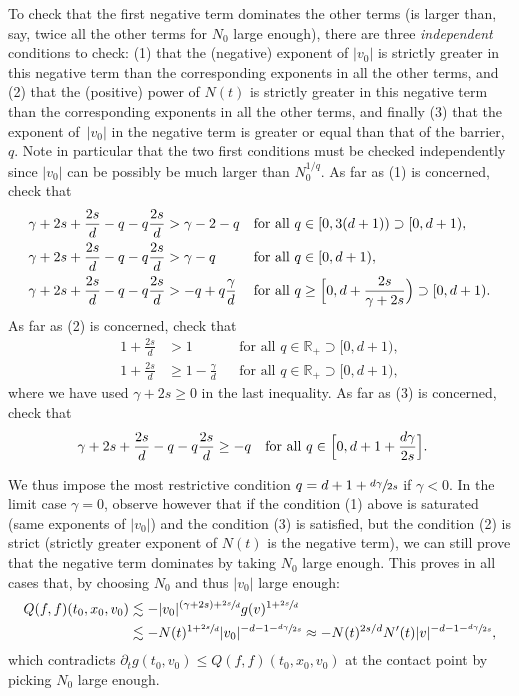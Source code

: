 \documentclass[JEP,XML,SOM,Unicode,NoFloatCountersInSection]{cedram}
\theoremstyle{plain}
\theoremstyle{definition}
\numberwithin{equation}{section}
\newcommand{\R}{\mathbb R}
\let\A N
\newcommand{\Ao}{N_0}
\begin{document}
To check that the first negative term dominates the other terms
(\ie is larger than, say, twice all the other terms for $\Ao$ large
enough), there are three \emph{independent} conditions to check: (1)
that the (negative) exponent of $|v_0|$ is strictly greater in this
negative term than the corresponding exponents in all the other terms,
and (2) that the (positive) power of $\A(t)$ is strictly greater in
this negative term than the corresponding exponents in all the other
terms, and finally (3) that the exponent of~$|v_0|$ in the negative
term is greater or equal than that of the barrier, \ie $q$. Note in
particular that the two first conditions must be checked independently since
$|v_0|$ can be possibly be much larger than $\Ao^{1/q}$. As far as (1)
is concerned, check that
\begin{align*}
\gamma + 2s + \frac{2s}{d} -q -q\frac{2s}{d}
& > \gamma - 2 - q
&& \text{for all $q \in [0,3(d+1)) \supset [0,d+1)$}, \\
\gamma + 2s + \frac{2s}{d} -q -q\frac{2s}{d}
& > \gamma - q
&& \text{for all $q \in [0,d+1)$}, \\
\gamma + 2s + \frac{2s}{d} -q -q\frac{2s}{d}
& > - q + q \frac{\gamma}{d}
&& \text{for all $q \ge \Bigl[0,d+\frac{2s}{\gamma+2s}\Bigr)
\supset [0,d+1)$}.
\end{align*}
As far as (2) is concerned, check that
\begin{align*}
1+\frac{2s}{d}
& > 1
&& \text{for all $q \in \R_+ \supset [0,d+1)$}, \\
1 + \frac{2s}{d}
& \ge 1- \frac{\gamma}{d}
&& \text{for all $q \in \R_+ \supset [0,d+1)$},
\end{align*}
where we have used $\gamma + 2s \ge 0$ in the last inequality. As far
as (3) is concerned, check that
\begin{align*}
\gamma + 2s + \frac{2s}{d} - q - q \frac{2s}{d}
& \ge -q
&& \text{for all $q \in \Bigl[0,d+1 + \frac{d\gamma}{2s}\Bigr]$.}
\end{align*}

We thus impose the most restrictive condition
$q = d+1 + \sfrac{d\gamma}{2s}$ if $\gamma <0$. In the limit case
$\gamma=0$, observe however that if the condition (1) above is
saturated (same exponents of $|v_0|$) and the condition (3) is
satisfied, but the condition (2) is strict (strictly greater exponent
of $\A(t)$ is the negative term), we can still prove that the negative
term dominates by taking $\Ao$ large enough. This proves in all cases
that, by choosing $\Ao$ and thus $|v_0|$ large enough:
\begin{align*}
Q(f,f)(t_0,x_0,v_0) &\lesssim -|v_0|^{(\gamma+2s)+\sfrac{2s}d} g(v)^{1+\sfrac{2s}d} \\
& \lesssim -\A(t)^{1+\sfrac{2s}d} |v_0|^{-d-1-\sfrac{d \gamma}{2s}} \approx -\A(t)^{2s/d} \A'(t) |v|^{-d-1-\sfrac{d\gamma}{2s}},
\end{align*}
which contradicts $\partial_t g(t_0,v_0) \le Q(f,f)(t_0,x_0,v_0)$ at
the contact point by picking $\Ao$ large enough.
\end{document}
